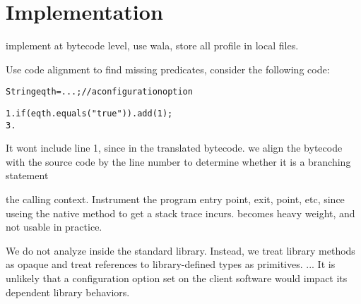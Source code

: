 \section{Implementation}
\label{sec:implementation}

implement at bytecode level, use wala, store all profile in local files.

Use code alignment to find missing predicates, consider the following code:

\begin{CodeOut}
\begin{alltt}
  String eqth = ...; //a configuration option

1. if (eqth.equals("true")) .   add(1);
3. \ttrcb
\end{alltt}
\end{CodeOut}

It wont include  line 1, since in the translated bytecode.
we align the bytecode with the source code by the line number to
determine whether it is a branching statement


the calling context. Instrument the program entry point, exit, point, etc,
since useing the native method to get a stack trace incurs.
becomes heavy weight, and not usable in practice.

We do not analyze inside the standard library. Instead, we treat library
methods as opaque and treat references to library-defined types as
primitives. ... It is unlikely that a configuration option set on
the client software would impact its dependent library behaviors.
